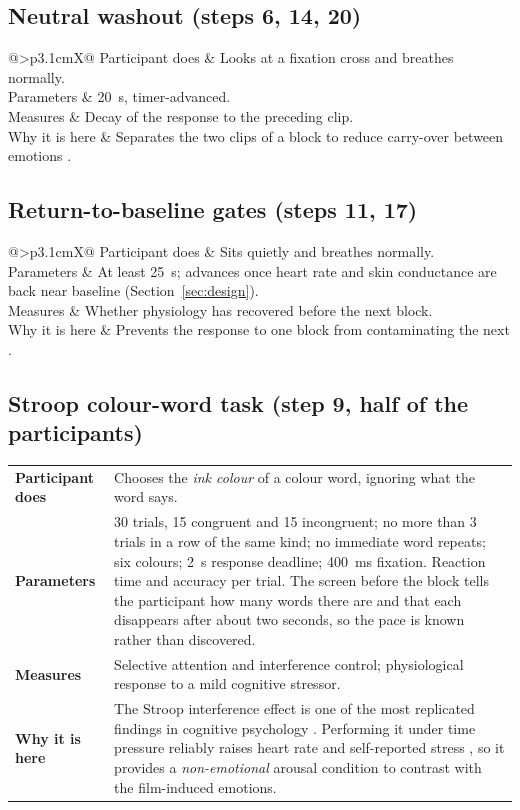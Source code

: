 \documentclass[11pt,a4paper]{article}
\makeatletter
\newcommand{\taskdetail}[4]{%
  \begin{tabularx}{\linewidth}{@{}>{\bfseries}p{3.1cm}X@{}}
    Participant does & #1 \\
    Parameters & #2 \\
    Measures & #3 \\
    Why it is here & #4 \\
  \end{tabularx}}
\makeatother
\begin{document}
\subsection{Neutral washout (steps 6, 14, 20)}
\taskdetail
{Looks at a fixation cross and breathes normally.}
{20~s, timer-advanced.}
{Decay of the response to the preceding clip.}
{Separates the two clips of a block to reduce carry-over between emotions \cite{rottenberg2007}.}

\subsection{Return-to-baseline gates (steps 11, 17)}
\taskdetail
{Sits quietly and breathes normally.}
{At least 25~s; advances once heart rate and skin conductance are back near baseline (Section~\ref{sec:design}).}
{Whether physiology has recovered before the next block.}
{Prevents the response to one block from contaminating the next \cite{jennings1992,rottenberg2007}.}

\subsection{Stroop colour-word task (step 9, half of the participants)}
\taskdetail
{Chooses the \emph{ink colour} of a colour word, ignoring what the word says.}
{30 trials, 15 congruent and 15 incongruent; no more than 3 trials in a row of the same kind; no immediate word
repeats; six colours; 2~s response deadline; 400~ms fixation. Reaction time and accuracy per trial. The screen
before the block tells the participant how many words there are and that each disappears after about two seconds,
so the pace is known rather than discovered.}
{Selective attention and interference control; physiological response to a mild cognitive stressor.}
{The Stroop interference effect is one of the most replicated findings in cognitive psychology
\cite{stroop1935,macleod1991}. Performing it under time pressure reliably raises heart rate and self-reported
stress \cite{renaud1997}, so it provides a \emph{non-emotional} arousal condition to contrast with the film-induced
emotions.}
\end{document}
